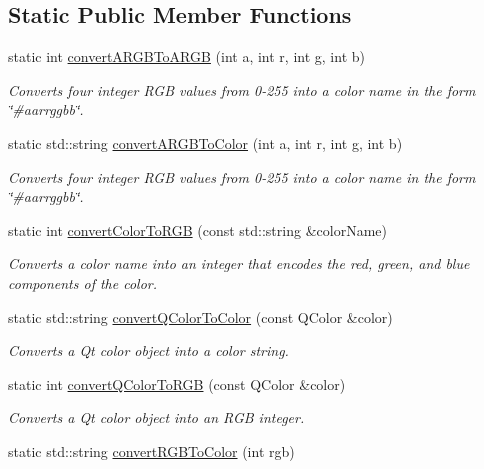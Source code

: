\subsection*{Static Public Member Functions}
\begin{DoxyCompactItemize}
\item 
static int \mbox{\hyperlink{classGColor_a9678f670b71cc46a68b746bda9765f4b}{convert\+A\+R\+G\+B\+To\+A\+R\+GB}} (int a, int r, int g, int b)
\begin{DoxyCompactList}\small\item\em Converts four integer R\+GB values from 0-\/255 into a color name in the form {\ttfamily \char`\"{}\#aarrggbb\char`\"{}}. \end{DoxyCompactList}\item 
static std\+::string \mbox{\hyperlink{classGColor_abc3a0188f264217b768e4a9a63fbc54e}{convert\+A\+R\+G\+B\+To\+Color}} (int a, int r, int g, int b)
\begin{DoxyCompactList}\small\item\em Converts four integer R\+GB values from 0-\/255 into a color name in the form {\ttfamily \char`\"{}\#aarrggbb\char`\"{}}. \end{DoxyCompactList}\item 
static int \mbox{\hyperlink{classGColor_aab4a1480d396f913220aea51d117eb94}{convert\+Color\+To\+R\+GB}} (const std\+::string \&color\+Name)
\begin{DoxyCompactList}\small\item\em Converts a color name into an integer that encodes the red, green, and blue components of the color. \end{DoxyCompactList}\item 
static std\+::string \mbox{\hyperlink{classGColor_a2ad78585a77dad65eb23299714545f7c}{convert\+Q\+Color\+To\+Color}} (const Q\+Color \&color)
\begin{DoxyCompactList}\small\item\em Converts a Qt color object into a color string. \end{DoxyCompactList}\item 
static int \mbox{\hyperlink{classGColor_a30f06933a10f00500d6b7991f8b61dde}{convert\+Q\+Color\+To\+R\+GB}} (const Q\+Color \&color)
\begin{DoxyCompactList}\small\item\em Converts a Qt color object into an R\+GB integer. \end{DoxyCompactList}\item 
static std\+::string \mbox{\hyperlink{classGColor_a64353dd79967412aeebe46219e4a71df}{convert\+R\+G\+B\+To\+Color}} (int rgb)

\end{DoxyCompactItemize}
